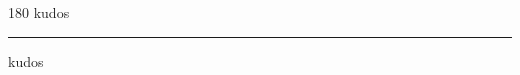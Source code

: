 
\begin{frame}
\begin{center}
\begin{turn}{180}
{\fontsize{2.5cm}{1em}\selectfont kudos}
\end{turn}
\vspace{1em}\par  
\hrule
\vspace{1em}\par  
{\fontsize{2.5cm}{1em}\selectfont kudos}
\end{center}
\end{frame}
